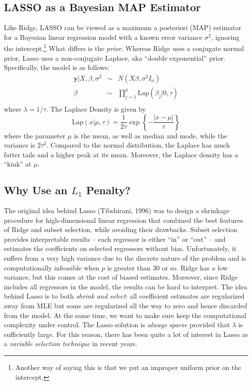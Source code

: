\subsection{LASSO as a Bayesian MAP Estimator}
Like Ridge, LASSO can be viewed as a maximum a posteriori (MAP) estimator for a Bayesian linear regression model with a known error variance $\sigma^2$, ignoring the intercept.\footnote{Another way of saying this is that we put an improper uniform prior on the intercept.} What differs is the \emph{prior}. Whereas Ridge uses a conjugate normal prior, Lasso uses a non-conjugate Laplace, aka ``double exponential'' prior. Specifically, the model is as follows:
	\begin{eqnarray*}
		\mathbf{y}|X,\beta, \sigma^2 &\sim& N(X\beta,\sigma^2 I_n)\\
		\beta&\sim& \prod_{j=1}^p \mbox{Lap}(\beta_j|0, \tau)\\
	\end{eqnarray*}
where $\lambda = 1/\tau$. The Laplace Density is given by
	$$\mbox{Lap}(x|\mu,\tau)= \frac{1}{2\tau}\exp\left
	\{-\frac{|x-\mu|}{\tau} \right\}$$
where the parameter $\mu$ is the mean, as well as median and mode, while the variance is $2\tau^2$. Compared to the normal distribution, the Laplace has much fatter tails and a higher peak at its mean. Moreover, the Laplace density has a ``kink'' at $\mu$.


\subsection{Why Use an $L_1$ Penalty?}
The original idea behind Lasso (Tibshirani, 1996) was to design a shrinkage procedure for high-dimensional linear regression that combined the best features of Ridge and subset selection, while avoiding their drawbacks.
Subset selection provides interpretable results -- each regressor is either ``in'' or ``out'' -- and estimates the coefficients on selected regressors without bias.
Unfortunately, it suffers from a very high variance due to the discrete nature of the problem and is computationally infeasible when $p$ is greater than 30 or so.
Ridge has a low variance, but this comes at the cost of biased estimates.
Moreover, since Ridge includes all regressors in the model, the results can be hard to interpret.
The idea behind Lasso is to both \emph{shrink and select}: all coefficient estimates are regularized away from MLE but some are regularized all the way to zero and hence discarded from the model.
At the same time, we want to make sure keep the computational complexity under control.
The Lasso solution is \emph{always sparse} provided that $\lambda$ is sufficiently large.
For this reason, there has been quite a lot of interest in Lasso as a \emph{variable selection technique} in recent years. 

